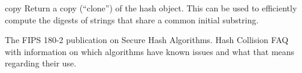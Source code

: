 \begin{methoddesc}[hash]{copy}{}
Return a copy (``clone'') of the hash object.  This can be used to
efficiently compute the digests of strings that share a common initial
substring.
\end{methoddesc}

\begin{seealso}
  {The FIPS 180-2 publication on Secure Hash Algorithms.}
  {Hash Collision FAQ with information on which algorithms have known issues and
   what that means regarding their use.}
\end{seealso}
